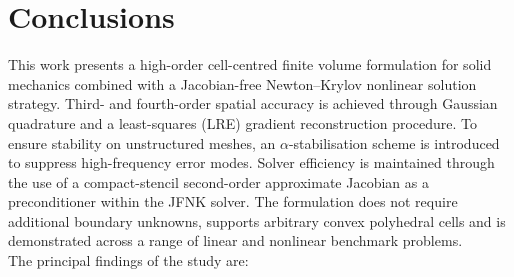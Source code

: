 \documentclass[review,3p]{elsarticle}
\begin{document}
\section{Conclusions} \label{sec:conclusion}
This work presents a high-order cell-centred finite volume formulation for solid mechanics combined with a Jacobian-free Newton–Krylov nonlinear solution strategy. 
Third- and fourth-order spatial accuracy is achieved through Gaussian quadrature and a least-squares (LRE) gradient reconstruction procedure.
To ensure stability on unstructured meshes, an $\alpha$-stabilisation scheme is introduced to suppress high-frequency error modes. 
Solver efficiency is maintained through the use of a compact-stencil second-order approximate Jacobian as a preconditioner within the JFNK solver.
The formulation does not require additional boundary unknowns, supports arbitrary convex polyhedral cells and is demonstrated across a range of linear and nonlinear benchmark problems.
\\
The principal findings of the study are:
%
\end{document}
